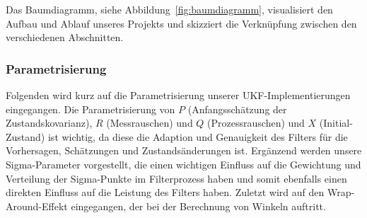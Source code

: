\documentclass[conference]{IEEEtran}[10pt]
\begin{document}
Das Baumdiagramm, siehe Abbildung~\ref{fig:baumdiagramm}, visualisiert den Aufbau und Ablauf unseres Projekts und skizziert die Verknüpfung zwischen den verschiedenen Abschnitten.


\subsubsection{Parametrisierung}


Folgenden wird kurz auf die Parametrisierung unserer UKF-Implementierungen eingegangen. Die Parametrisierung von \(P\) (Anfangsschätzung der Zustandskovarianz), \(R\) (Messrauschen) und \(Q\) (Prozessrauschen) und \(X\) (Initial-Zustand) ist wichtig, da diese die Adaption und Genauigkeit des Filters für die Vorhersagen, Schätzungen und Zustandsänderungen ist. Ergänzend werden unsere Sigma-Parameter vorgestellt, die einen wichtigen Einfluss auf die Gewichtung und Verteilung der Sigma-Punkte im Filterprozess haben und somit ebenfalls einen direkten Einfluss auf die Leistung des Filters haben. Zuletzt wird auf den Wrap-Around-Effekt eingegangen, der bei der Berechnung von Winkeln auftritt.
\end{document}
